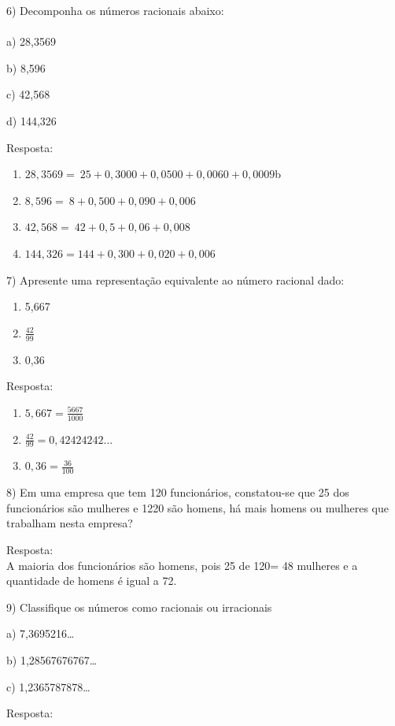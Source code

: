 {6) Decomponha os números racionais abaixo:\\
~\\
a) 28,3569

b) 8,596

c) 42,568

d) 144,326

Resposta:

\begin{enumerate}
\def\labelenumi{\alph{enumi})}
\item
  \(28,3569 = \ 25 + 0,3000 + 0,0500 + 0,0060 + 0,0009\)b
\item
  \(8,596 = \ 8 + 0,500 + 0,090 + 0,006\)
\item
  \(42,568 = \ 42 + 0,5 + 0,06 + 0,008\)
\item
  \(144,326 = 144 + 0,300 + 0,020 + 0,006\)
\end{enumerate}

7) Apresente uma representação equivalente ao número racional dado:

\begin{enumerate}
\def\labelenumi{\alph{enumi})}
\item
  5,667
\item
  \(\frac{42}{99}\)
\item
  0,36
\end{enumerate}

Resposta:~~~~~~~~

\begin{enumerate}
\def\labelenumi{\alph{enumi})}
\item
  \(5,667 = \frac{5667}{1000}\)
\item
  \(\frac{42}{99} = 0,42424242...\)
\item
  \(0,36 = \frac{36}{100}\)
\end{enumerate}

8) Em uma empresa que tem 120 funcionários, constatou-se que 25 dos
funcionários são mulheres e 1220 são homens, há mais homens ou mulheres
que trabalham nesta empresa?~

Resposta:\\
A maioria dos funcionários são homens, pois 25 de 120= 48 mulheres e a
quantidade de homens é igual a 72.

9) Classifique os números como racionais ou irracionais

a) 7,3695216\ldots{}

b) 1,28567676767\ldots{}

c) 1,2365787878\ldots{}

Resposta:

}
